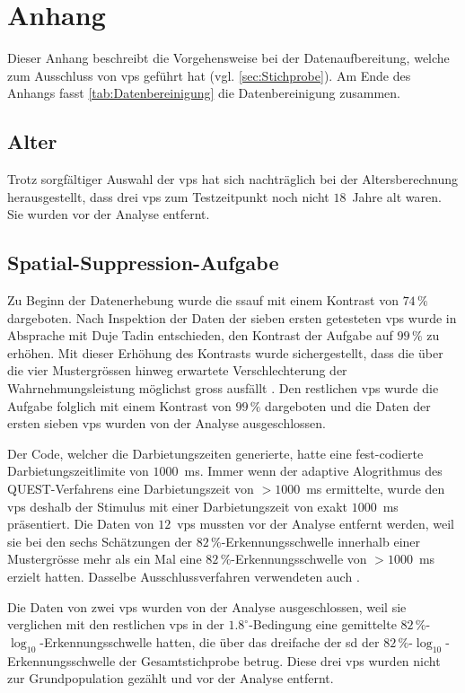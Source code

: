 \documentclass[11pt, twoside, a4paper]{book}		%
\begin{document}
\chapter{Anhang \label{cha:Anhang_A}}
Dieser Anhang beschreibt die Vorgehensweise bei der Datenaufbereitung, welche zum Ausschluss von \glspl{vp} geführt hat (vgl. \autoref{sec:Stichprobe}). Am Ende des Anhangs fasst \autoref{tab:Datenbereinigung} die Datenbereinigung zusammen.

\section{Alter}
Trotz sorgfältiger Auswahl der \glspl{vp} hat sich nachträglich bei der Altersberechnung herausgestellt, dass drei \glspl{vp} zum Testzeitpunkt noch nicht $18$~Jahre alt waren. Sie wurden vor der Analyse entfernt.

\section{Spatial-Suppression-Aufgabe}
Zu Beginn der Datenerhebung wurde die \gls{ssauf} mit einem Kontrast von $74\,\%$ dargeboten. Nach Inspektion der Daten der sieben ersten getesteten \glspl{vp} wurde in Absprache mit Duje Tadin entschieden, den Kontrast der Aufgabe auf $99\,\%$ zu erhöhen. Mit dieser Erhöhung des Kontrasts wurde sichergestellt, dass die über die vier Mustergrössen hinweg erwartete Verschlechterung der Wahrnehmungsleistung möglichst gross ausfällt \citep[für den Zusammenhang zwischen Kontrast und Wahrnehmungsleistung siehe][]{Tadin2003}. Den restlichen \glspl{vp} wurde die Aufgabe folglich mit einem Kontrast von $99\,\%$ dargeboten und die Daten der ersten sieben \glspl{vp} wurden von der Analyse ausgeschlossen.

Der Code, welcher die Darbietungszeiten generierte, hatte eine fest-codierte Darbietungszeitlimite von $1000$~ms. Immer wenn der adaptive Alogrithmus des QUEST-Verfahrens \citep{Watson1983} eine Darbietungszeit von $> 1000$~ms ermittelte, wurde den \glspl{vp} deshalb der Stimulus mit einer Darbietungszeit von exakt $1000$~ms präsentiert. 
Die Daten von $12$~\glspl{vp} mussten vor der Analyse entfernt werden, weil sie bei den sechs Schätzungen der $82\,\%$-Er\-ken\-nungs\-schwel\-le innerhalb einer Mustergrösse mehr als ein Mal eine $82\,\%$-Er\-ken\-nungs\-schwel\-le von $> 1000$~ms erzielt hatten. Dasselbe Ausschlussverfahren verwendeten auch \citet{Melnick2013}.

Die Daten von zwei \glspl{vp} wurden von der Analyse ausgeschlossen, weil sie verglichen mit den restlichen \glspl{vp} in der $1.8^{\circ}$-Be\-ding\-ung eine gemittelte $82\,\%$-$\log_{10}$-Er\-ken\-nungs\-schwel\-le hatten, die über das dreifache der \gls{sd} der $82\,\%$-$\log_{10}$-Er\-ken\-nungs\-schwel\-le der Gesamtstichprobe betrug. Diese drei \glspl{vp} wurden nicht zur Grundpopulation gezählt und vor der Analyse entfernt.
\end{document}
